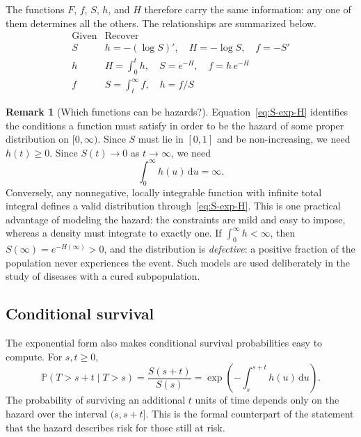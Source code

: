 \documentclass[11pt]{article}
\theoremstyle{definition}
\newtheorem{remark}[definition]{Remark}
\theoremstyle{plain}
\newcommand{\Prob}{\mathbb{P}}
\newcommand{\dd}{\,\mathrm{d}}
\begin{document}
The functions $F$, $f$, $S$, $h$, and $H$ therefore carry the same information: any one of them determines all the others. The relationships are summarized below.
\[
  \begin{array}{c|c}
    \text{Given} & \text{Recover} \\ \hline
    S & h = -(\log S)', \quad H = -\log S, \quad f = -S' \\[2pt]
    h & H = \int_0^t h, \quad S = e^{-H}, \quad f = h\,e^{-H} \\[2pt]
    f & S = \int_t^\infty f, \quad h = f/S
  \end{array}
\]

\begin{remark}[Which functions can be hazards?]\label{rem:valid-hazard}
Equation~\eqref{eq:S-exp-H} identifies the conditions a function must satisfy in order to be the hazard of some proper distribution on $[0,\infty)$. Since $S$ must lie in $[0,1]$ and be non-increasing, we need $h(t) \ge 0$. Since $S(t) \to 0$ as $t \to \infty$, we need
\[
  \int_0^\infty h(u) \dd u = \infty.
\]
Conversely, any nonnegative, locally integrable function with infinite total integral defines a valid distribution through~\eqref{eq:S-exp-H}. This is one practical advantage of modeling the hazard: the constraints are mild and easy to impose, whereas a density must integrate to exactly one. If $\int_0^\infty h < \infty$, then $S(\infty) = e^{-H(\infty)} > 0$, and the distribution is \emph{defective}: a positive fraction of the population never experiences the event. Such models are used deliberately in the study of diseases with a cured subpopulation.
\end{remark}

\subsection*{Conditional survival}

The exponential form also makes conditional survival probabilities easy to compute. For $s, t \ge 0$,
\begin{equation}\label{eq:cond-survival}
  \Prob(T > s + t \mid T > s)
  = \frac{S(s + t)}{S(s)}
  = \exp\!\left(-\int_s^{s+t} h(u) \dd u\right).
\end{equation}
The probability of surviving an additional $t$ units of time depends only on the hazard over the interval $(s, s+t]$. This is the formal counterpart of the statement that the hazard describes risk for those still at risk.

\end{document}
